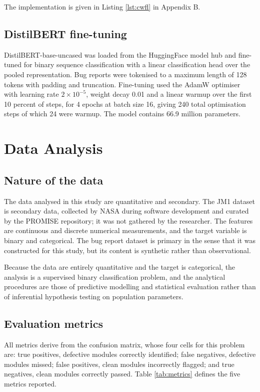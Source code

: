 \documentclass[12pt,a4paper,oneside]{report}
\begin{document}
The implementation is given in Listing \ref{lst:cwfl} in Appendix B.

\subsection{DistilBERT fine-tuning}

DistilBERT-base-uncased \cite{sanh2019} was loaded from the HuggingFace model hub and fine-tuned for binary sequence classification with a linear classification head over the pooled representation. Bug reports were tokenised to a maximum length of 128 tokens with padding and truncation. Fine-tuning used the AdamW optimiser with learning rate $2 \times 10^{-5}$, weight decay 0.01 and a linear warmup over the first 10 percent of steps, for 4 epochs at batch size 16, giving 240 total optimisation steps of which 24 were warmup. The model contains 66.9 million parameters.

\section{Data Analysis}

\subsection{Nature of the data}

The data analysed in this study are quantitative and secondary. The JM1 dataset is secondary data, collected by NASA during software development and curated by the PROMISE repository; it was not gathered by the researcher. The features are continuous and discrete numerical measurements, and the target variable is binary and categorical. The bug report dataset is primary in the sense that it was constructed for this study, but its content is synthetic rather than observational.

Because the data are entirely quantitative and the target is categorical, the analysis is a supervised binary classification problem, and the analytical procedures are those of predictive modelling and statistical evaluation rather than of inferential hypothesis testing on population parameters.

\subsection{Evaluation metrics}

All metrics derive from the confusion matrix, whose four cells for this problem are: true positives, defective modules correctly identified; false negatives, defective modules missed; false positives, clean modules incorrectly flagged; and true negatives, clean modules correctly passed. Table \ref{tab:metrics} defines the five metrics reported.
\end{document}
